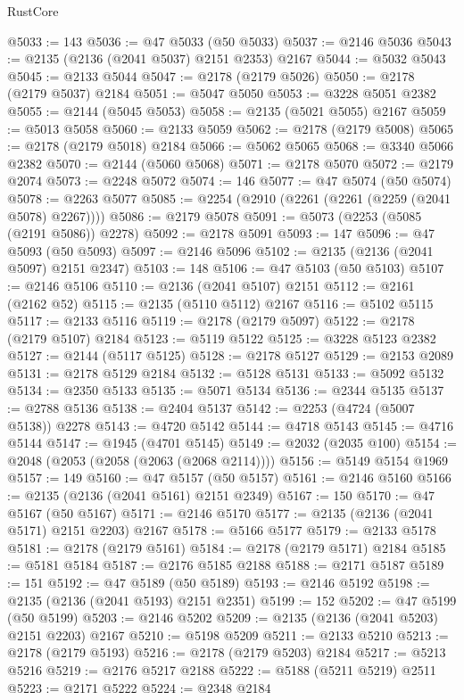 \begin{lexlean}{RustCore}
\begin{coremodule}
@5033 := 143
@5036 := @47 @5033 (@50 @5033)
@5037 := @2146 @5036
@5043 := @2135 (@2136 (@2041 @5037) @2151 @2353) @2167
@5044 := @5032 @5043
@5045 := @2133 @5044
@5047 := @2178 (@2179 @5026)
@5050 := @2178 (@2179 @5037) @2184
@5051 := @5047 @5050
@5053 := @3228 @5051 @2382
@5055 := @2144 (@5045 @5053)
@5058 := @2135 (@5021 @5055) @2167
@5059 := @5013 @5058
@5060 := @2133 @5059
@5062 := @2178 (@2179 @5008)
@5065 := @2178 (@2179 @5018) @2184
@5066 := @5062 @5065
@5068 := @3340 @5066 @2382
@5070 := @2144 (@5060 @5068)
@5071 := @2178 @5070
@5072 := @2179 @2074
@5073 := @2248 @5072
@5074 := 146
@5077 := @47 @5074 (@50 @5074)
@5078 := @2263 @5077
@5085 := @2254 (@2910 (@2261 (@2261 (@2259 (@2041 @5078) @2267))))
@5086 := @2179 @5078
@5091 := @5073 (@2253 (@5085 (@2191 @5086)) @2278)
@5092 := @2178 @5091
@5093 := 147
@5096 := @47 @5093 (@50 @5093)
@5097 := @2146 @5096
@5102 := @2135 (@2136 (@2041 @5097) @2151 @2347)
@5103 := 148
@5106 := @47 @5103 (@50 @5103)
@5107 := @2146 @5106
@5110 := @2136 (@2041 @5107) @2151
@5112 := @2161 (@2162 @52)
@5115 := @2135 (@5110 @5112) @2167
@5116 := @5102 @5115
@5117 := @2133 @5116
@5119 := @2178 (@2179 @5097)
@5122 := @2178 (@2179 @5107) @2184
@5123 := @5119 @5122
@5125 := @3228 @5123 @2382
@5127 := @2144 (@5117 @5125)
@5128 := @2178 @5127
@5129 := @2153 @2089
@5131 := @2178 @5129 @2184
@5132 := @5128 @5131
@5133 := @5092 @5132
@5134 := @2350 @5133
@5135 := @5071 @5134
@5136 := @2344 @5135
@5137 := @2788 @5136
@5138 := @2404 @5137
@5142 := @2253 (@4724 (@5007 @5138)) @2278
@5143 := @4720 @5142
@5144 := @4718 @5143
@5145 := @4716 @5144
@5147 := @1945 (@4701 @5145)
@5149 := @2032 (@2035 @100)
@5154 := @2048 (@2053 (@2058 (@2063 (@2068 @2114))))
@5156 := @5149 @5154 @1969
@5157 := 149
@5160 := @47 @5157 (@50 @5157)
@5161 := @2146 @5160
@5166 := @2135 (@2136 (@2041 @5161) @2151 @2349)
@5167 := 150
@5170 := @47 @5167 (@50 @5167)
@5171 := @2146 @5170
@5177 := @2135 (@2136 (@2041 @5171) @2151 @2203) @2167
@5178 := @5166 @5177
@5179 := @2133 @5178
@5181 := @2178 (@2179 @5161)
@5184 := @2178 (@2179 @5171) @2184
@5185 := @5181 @5184
@5187 := @2176 @5185 @2188
@5188 := @2171 @5187
@5189 := 151
@5192 := @47 @5189 (@50 @5189)
@5193 := @2146 @5192
@5198 := @2135 (@2136 (@2041 @5193) @2151 @2351)
@5199 := 152
@5202 := @47 @5199 (@50 @5199)
@5203 := @2146 @5202
@5209 := @2135 (@2136 (@2041 @5203) @2151 @2203) @2167
@5210 := @5198 @5209
@5211 := @2133 @5210
@5213 := @2178 (@2179 @5193)
@5216 := @2178 (@2179 @5203) @2184
@5217 := @5213 @5216
@5219 := @2176 @5217 @2188
@5222 := @5188 (@5211 @5219) @2511
@5223 := @2171 @5222
@5224 := @2348 @2184

\end{coremodule}
\end{lexlean}

